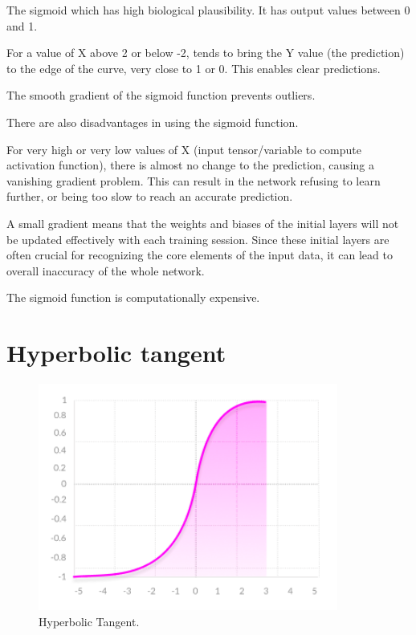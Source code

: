 \documentclass[a4paper,13pt,twoside]{book}
\begin{document}
The sigmoid which has high biological plausibility. It has output values between 0 and 1.

For a value of X above 2 or below -2, tends to bring the Y value (the prediction) to the edge of the curve, very close to 1 or 0. This enables clear predictions.

The smooth gradient of the sigmoid function prevents outliers.

There are also disadvantages in using the sigmoid function.

For very high or very low values of X (input tensor/variable to compute activation function), there is almost no change to the prediction, causing a vanishing gradient problem. This can result in the network refusing to learn further, or being too slow to reach an accurate prediction.

A small gradient means that the weights and biases of the initial layers will not be updated effectively with each training session. Since these initial layers are often crucial for recognizing the core elements of the input data, it can lead to overall inaccuracy of the whole network.

The sigmoid function is computationally expensive.

\section{Hyperbolic tangent}

\begin{figure}[H]
  \includegraphics[width=\linewidth]{Images/TanHhyperbolic.png}
  \caption{Hyperbolic Tangent.}
  \label{fig:Hyperbolic Tangent}
\end{figure}
\end{document}
